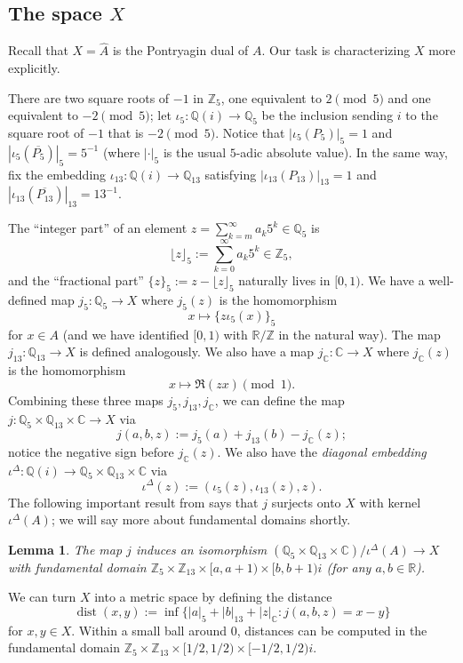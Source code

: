 \documentclass[11pt]{amsart}
\newtheorem{lemma}{Lemma}[section]
\theoremstyle{definition}
\newcommand{\C}{{\mathbb C}}
\newcommand{\Q}{{\mathbb Q}}
\newcommand{\R}{{\mathbb R}}
\newcommand{\Z}{{\mathbb Z}}
\DeclareMathOperator{\dist}{dist}
\begin{document}
\subsection{The space $X$}\label{sec:X-setup}
Recall that $X = \widehat{A}$ is the Pontryagin dual of $A$.  Our task is characterizing $X$ more explicitly.

There are two square roots of $-1$ in $\Z_5$, one equivalent to $2 \pmod{5}$ and one equivalent to $-2 \pmod{5}$; let $\iota_{5}: \mathbb{Q}(i) \to \mathbb{Q}_{5}$ be the inclusion sending $i$ to the square root of $-1$ that is $-2 \pmod{5}$.  Notice that $|\iota_5(P_5)|_5=1$ and $|\iota_5(\overline{P_5})|_5=5^{-1}$ (where $|\cdot|_5$ is the usual $5$-adic absolute value). In the same way, fix the embedding $\iota_{13}: \mathbb{Q}(i) \to \mathbb{Q}_{13}$ satisfying $|\iota_{13}(P_{13})|_{13}=1$ and $|\iota_{13}(\overline{P_{13}})|_{13}={13}^{-1}$.

The ``integer part'' of an element $z=\sum_{k=m}^\infty a_k 5^k \in \Q_5$ is
$$\lfloor z \rfloor_5:=\sum_{k=0}^\infty a_k 5^k \in \mathbb{Z}_5,$$
and the ``fractional part'' $\{z\}_5:=z-\lfloor z \rfloor_5$ naturally lives in $[0,1)$.  We have a well-defined map $j_5:\Q_5 \to X$ where $j_5(z)$ is the homomorphism
$$x \mapsto \{z\iota_5(x)\}_5$$
for $x \in A$ (and we have identified $[0,1)$ with $\R/\Z$ in the natural way).  The map $j_{13}:\Q_{13} \to X$ is defined analogously.  We also have a map $j_{\C}:\C \to X$ where $j_{\C}(z)$ is the homomorphism
$$x \mapsto \Re(zx) \pmod{1}.$$
Combining these three maps $j_5,j_{13},j_{\C}$, we can define the map $j: \Q_5 \times \Q_{13} \times \C \to X$ via
$$j(a,b,z):=j_5(a)+j_{13}(b)-j_{\C}(z);$$
notice the negative sign before $j_{\C}(z)$.  We also have the \emph{diagonal embedding} $\iota^{\Delta}: \Q(i) \to \Q_5 \times \Q_{13} \times \C$ via
$$\iota^{\Delta}(z):=(\iota_5(z),\iota_{13}(z),z).$$
The following important result from \cite[Proposition 6.2]{Man13} says that $j$ surjects onto $X$ with kernel $\iota^{\Delta}(A)$; we will say more about fundamental domains shortly.

\begin{lemma}\label{lem:freddie-isom}
The map $j$ induces an isomorphism $(\mathbb{Q}_5 \times \mathbb{Q}_{13} \times \mathbb{C})/
\iota^{\Delta}(A) \to X$ with fundamental domain $\mathbb{Z}_5 \times \mathbb{Z}_{13} \times [a, a + 1) \times [b, b + 1)i$ (for any $a, b \in \mathbb{R}$).
\end{lemma}

We can turn $X$ into a metric space by defining the distance
$$\dist(x, y):= \inf \{|a|_5 + |b|_{13} + |z|_\mathbb{C}: j(a, b, z) = x - y\}$$
for $x,y \in X$.  Within a small ball around $0$, distances can be computed in the fundamental domain $\mathbb{Z}_5 \times \mathbb{Z}_{13} \times [1/2, 1/2) \times [-1/2,1/2)i$.
\end{document}
